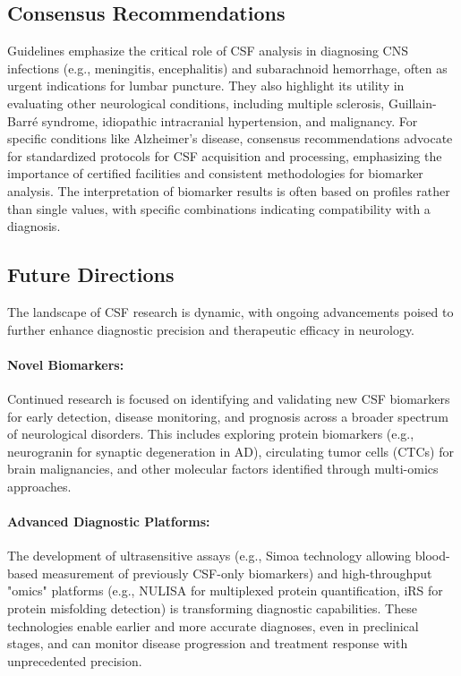 	\subsection*{Consensus Recommendations}
	
	Guidelines emphasize the critical role of CSF analysis in diagnosing CNS infections (e.g., meningitis, encephalitis) and subarachnoid hemorrhage, often as urgent indications for lumbar puncture. They also highlight its utility in evaluating other neurological conditions, including multiple sclerosis, Guillain-Barré syndrome, idiopathic intracranial hypertension, and malignancy. For specific conditions like Alzheimer's disease, consensus recommendations advocate for standardized protocols for CSF acquisition and processing, emphasizing the importance of certified facilities and consistent methodologies for biomarker analysis. The interpretation of biomarker results is often based on profiles rather than single values, with specific combinations indicating compatibility with a diagnosis.
	
	\subsection*{Future Directions}
	
	The landscape of CSF research is dynamic, with ongoing advancements poised to further enhance diagnostic precision and therapeutic efficacy in neurology.
	
	\paragraph{Novel Biomarkers:} Continued research is focused on identifying and validating new CSF biomarkers for early detection, disease monitoring, and prognosis across a broader spectrum of neurological disorders. This includes exploring protein biomarkers (e.g., neurogranin for synaptic degeneration in AD), circulating tumor cells (CTCs) for brain malignancies, and other molecular factors identified through multi-omics approaches.
	
	\paragraph{Advanced Diagnostic Platforms:} The development of ultrasensitive assays (e.g., Simoa technology allowing blood-based measurement of previously CSF-only biomarkers) and high-throughput "omics" platforms (e.g., NULISA for multiplexed protein quantification, iRS for protein misfolding detection) is transforming diagnostic capabilities. These technologies enable earlier and more accurate diagnoses, even in preclinical stages, and can monitor disease progression and treatment response with unprecedented precision.
	
